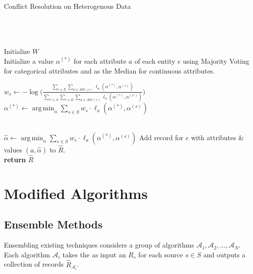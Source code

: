\documentclass{acm_proc_article-sp}
\DeclareMathOperator*{\argmin}{arg\,min}
\begin{document}
\begin{algorithm}
\small
\caption{Conflict Resolution on Heterogenous Data}
\begin{algorithmic}[1]
 \\
 \\
 \\

\State Initialize $W$ \\

\State Initialize a value $\alpha^{(*)}$ for each attribute $a$ of each entity $e$ using Majority Voting for categorical attributes and as the Median for continuous attributes.  

\State $w_s \leftarrow - \log \big ( \frac{\sum_{e \in E} \sum_{a \in Attr(e)} \ell_a(\alpha^{(*)}, \alpha^{(s)})}{\sum_{s' \in S} \sum_{e \in E}  \sum_{a \in Attr(e)} \ell_a(\alpha^{(*)}, \alpha^{(s')})} \big )$
\State $\alpha^{(*)} \leftarrow \argmin_\alpha \sum_{s \in S} w_s \cdot \ell_a(\alpha^{(*)}, \alpha^{(s)})$
\EndFor
\EndFor
\EndWhile

\\

\State $\hat{\alpha} \leftarrow \argmin_\alpha \sum_{s \in S} w_s \cdot \ell_a(\alpha^{(*)}, \alpha^{(s)})$
\EndFor
\State Add record for $e$ with attributes \& values $(a, \hat{\alpha})$ to $\hat{R}$.
\EndFor
\\

\State \textbf{return} $\hat{R}$
\EndFunction
\end{algorithmic}
\label{alg:crh}
\end{algorithm}  

\section{Modified Algorithms}

\subsection{Ensemble Methods}

Ensembling existing techniques considers a group of algorithms $\mathcal{A}_1,\mathcal{A}_2,\dots,\mathcal{A}_N$. Each algorithm $\mathcal{A}_i$ takes the as input an $R_s$ for each source $s \in S$ and outputs a collection of records $\hat{R}_{\mathcal{A}_i}$. 
\end{document}
